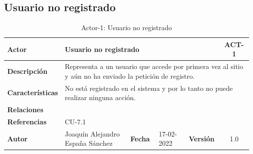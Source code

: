 \subsection{Usuario no registrado}
    \begin{table}[H]
    \begin{center}
        \begin{adjustbox}{width=\textwidth}
        \begin{tabular}{ | l | l | l | l | c | c | } 
            \hline
            \textbf{Actor} & \multicolumn{4}{l|}{Usuario no registrado} & \cellcolor{gray!50} \textbf{ACT-1}\\
            \hline
            \textbf{Descripción} & \multicolumn{5}{p{0.9\linewidth}|}{Representa a un usuario
            que accede por primera vez al sitio y aún no ha enviado la petición de registro.} \\
            \hline
            \textbf{Características} & \multicolumn{5}{p{0.5\linewidth}|}{No está registrado
            en el sistema y por lo tanto no puede realizar ninguna acción.} \\
            \hline
            \textbf{Relaciones} & \multicolumn{5}{p{0.5\linewidth}|}{ } \\
            \hline
            \textbf{Referencias} & \multicolumn{5}{p{0.5\linewidth}|}{CU-7.1} \\
            \hline
            \textbf{Autor} & \multicolumn{1}{p{0.25\linewidth}|}{Joaquín Alejandro España Sánchez} & \textbf{Fecha} & 
            17-02-2022     & \textbf{Versión}                                                      & 1.0\\
            \hline
        \end{tabular}
        \end{adjustbox}
        \caption{Actor-1: Usuario no registrado}
        \label{tab:unregistered-user}
    \end{center}
    \end{table}

